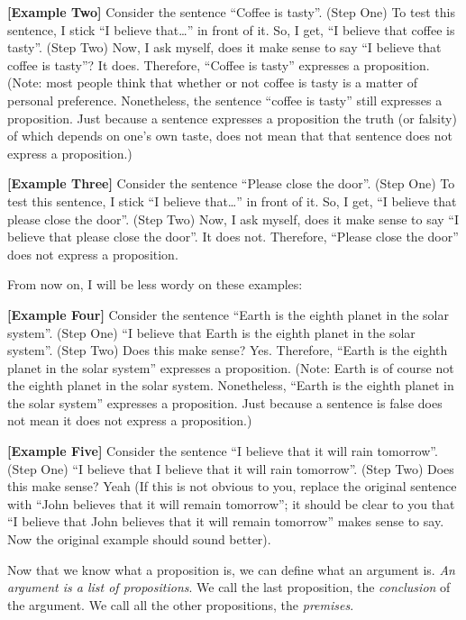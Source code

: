 \documentclass[
]{book}
\begin{document}
\textbf{{[}Example Two{]}} Consider the sentence ``Coffee is tasty''. (Step One) To test this sentence, I stick ``I believe that\ldots{}'' in front of it. So, I get, ``I believe that coffee is tasty''. (Step Two) Now, I ask myself, does it make sense to say ``I believe that coffee is tasty''? It does. Therefore, ``Coffee is tasty'' expresses a proposition. (Note: most people think that whether or not coffee is tasty is a matter of personal preference. Nonetheless, the sentence ``coffee is tasty'' still expresses a proposition. Just because a sentence expresses a proposition the truth (or falsity) of which depends on one's own taste, does not mean that that sentence does not express a proposition.)

\textbf{{[}Example Three{]}} Consider the sentence ``Please close the door''. (Step One) To test this sentence, I stick ``I believe that\ldots{}'' in front of it. So, I get, ``I believe that please close the door''. (Step Two) Now, I ask myself, does it make sense to say ``I believe that please close the door''. It does not. Therefore, ``Please close the door'' does not express a proposition.

From now on, I will be less wordy on these examples:

\textbf{{[}Example Four{]}} Consider the sentence ``Earth is the eighth planet in the solar system''. (Step One) ``I believe that Earth is the eighth planet in the solar system''. (Step Two) Does this make sense? Yes. Therefore, ``Earth is the eighth planet in the solar system'' expresses a proposition. (Note: Earth is of course not the eighth planet in the solar system. Nonetheless, ``Earth is the eighth planet in the solar system'' expresses a proposition. Just because a sentence is false does not mean it does not express a proposition.)

\textbf{{[}Example Five{]}} Consider the sentence ``I believe that it will rain tomorrow''. (Step One) ``I believe that I believe that it will rain tomorrow''. (Step Two) Does this make sense? Yeah (If this is not obvious to you, replace the original sentence with ``John believes that it will remain tomorrow''; it should be clear to you that ``I believe that John believes that it will remain tomorrow'' makes sense to say. Now the original example should sound better).

Now that we know what a proposition is, we can define what an argument is. \emph{An argument is a list of propositions}. We call the last proposition, the \emph{conclusion} of the argument. We call all the other propositions, the \emph{premises}.
\end{document}
